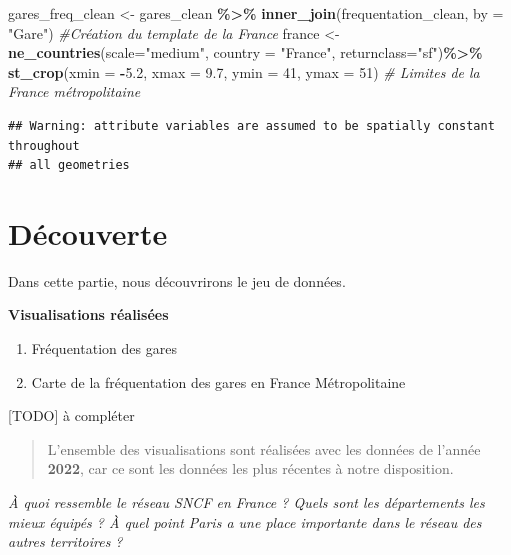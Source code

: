 \documentclass[
]{article}
\newenvironment{Shaded}{\begin{snugshade}}{\end{snugshade}}
\newcommand{\AttributeTok}[1]{\textcolor[rgb]{0.13,0.29,0.53}{#1}}
\newcommand{\CommentTok}[1]{\textcolor[rgb]{0.56,0.35,0.01}{\textit{#1}}}
\newcommand{\DecValTok}[1]{\textcolor[rgb]{0.00,0.00,0.81}{#1}}
\newcommand{\FloatTok}[1]{\textcolor[rgb]{0.00,0.00,0.81}{#1}}
\newcommand{\FunctionTok}[1]{\textcolor[rgb]{0.13,0.29,0.53}{\textbf{#1}}}
\newcommand{\NormalTok}[1]{#1}
\newcommand{\OtherTok}[1]{\textcolor[rgb]{0.56,0.35,0.01}{#1}}
\newcommand{\SpecialCharTok}[1]{\textcolor[rgb]{0.81,0.36,0.00}{\textbf{#1}}}
\newcommand{\StringTok}[1]{\textcolor[rgb]{0.31,0.60,0.02}{#1}}
\begin{document}
\begin{Shaded}
\begin{Highlighting}[]
\NormalTok{gares\_freq\_clean }\OtherTok{\textless{}{-}}\NormalTok{ gares\_clean }\SpecialCharTok{\%\textgreater{}\%} 
  \FunctionTok{inner\_join}\NormalTok{(frequentation\_clean, }\AttributeTok{by =} \StringTok{"Gare"}\NormalTok{)}
\CommentTok{\#Création du template de la France}
\NormalTok{france }\OtherTok{\textless{}{-}} \FunctionTok{ne\_countries}\NormalTok{(}\AttributeTok{scale=}\StringTok{"medium"}\NormalTok{, }\AttributeTok{country =} \StringTok{"France"}\NormalTok{, }\AttributeTok{returnclass=}\StringTok{"sf"}\NormalTok{)}\SpecialCharTok{\%\textgreater{}\%}
  \FunctionTok{st\_crop}\NormalTok{(}\AttributeTok{xmin =} \SpecialCharTok{{-}}\FloatTok{5.2}\NormalTok{, }\AttributeTok{xmax =} \FloatTok{9.7}\NormalTok{, }\AttributeTok{ymin =} \DecValTok{41}\NormalTok{, }\AttributeTok{ymax =} \DecValTok{51}\NormalTok{)  }\CommentTok{\# Limites de la France métropolitaine}
\end{Highlighting}
\end{Shaded}

\begin{verbatim}
## Warning: attribute variables are assumed to be spatially constant throughout
## all geometries
\end{verbatim}

\hypertarget{duxe9couverte}{%
\section{Découverte}\label{duxe9couverte}}

Dans cette partie, nous découvrirons le jeu de données.

\textbf{Visualisations réalisées}

\begin{enumerate}
\def\labelenumi{\arabic{enumi}.}
\item
  Fréquentation des gares
\item
  Carte de la fréquentation des gares en France Métropolitaine
\end{enumerate}

{[}TODO{]} à compléter

\begin{quote}
L'ensemble des visualisations sont réalisées avec les données de l'année
\textbf{2022}, car ce sont les données les plus récentes à notre
disposition.
\end{quote}

\emph{À quoi ressemble le réseau SNCF en France ? Quels sont les
départements les mieux équipés ? À quel point Paris a une place
importante dans le réseau des autres territoires ?}
\end{document}
